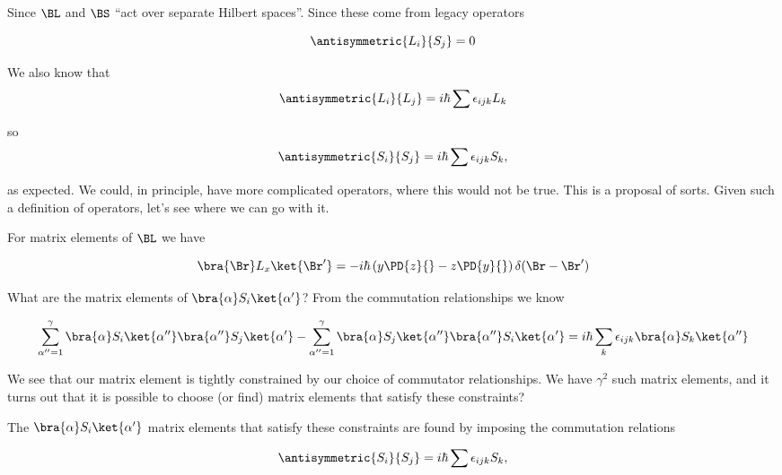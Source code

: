 Since $\BL$ and $\BS$ ``act over separate Hilbert spaces''.   Since these come from legacy operators

\begin{equation}\label{eqn:qmTwoL13:230}
\antisymmetric{L_i}{S_j} = 0
\end{equation}

We also know that
\begin{equation}\label{eqn:qmTwoL13:250}
\antisymmetric{L_i}{L_j} = i \hbar \sum \epsilon_{i j k} L_k
\end{equation}

so
\begin{equation}\label{eqn:qmTwoL13:270}
\antisymmetric{S_i}{S_j} = i \hbar \sum \epsilon_{i j k} S_k, 
\end{equation}

as expected.  We could, in principle, have more complicated operators, where this would not be true.  This is a proposal of sorts.  Given such a definition of operators, let's see where we can go with it.

For matrix elements of $\BL$ we have

\begin{equation}\label{eqn:qmTwoL13:290}
\bra{\Br} L_x \ket{\Br'} = -i \hbar \left( 
y \PD{z}{}
-z \PD{y}{} \right) \delta(\Br- \Br')
\end{equation}

What are the matrix elements of $\bra{\alpha} S_i \ket{\alpha'}$?  From the commutation relationships we know

\begin{equation}\label{eqn:qmTwoL13:310}
\sum_{\alpha'' = 1}^\gamma 
\bra{\alpha} S_i \ket{\alpha''}
\bra{\alpha''} S_j \ket{\alpha'}
-
\sum_{\alpha'' = 1}^\gamma 
\bra{\alpha} S_j \ket{\alpha''}
\bra{\alpha''} S_i \ket{\alpha'}
=
i \hbar \sum_k \epsilon_{ijk} 
\bra{\alpha} S_k \ket{\alpha''}
\end{equation}

We see that our matrix element is tightly constrained by our choice of commutator relationships.  We have $\gamma^2$ such matrix elements, and it turns out that it is possible to choose (or find) matrix elements that satisfy these constraints?

The $\bra{\alpha} S_i \ket{\alpha'}$ matrix elements that satisfy these constraints are found by imposing the commutation relations

\begin{equation}\label{eqn:qmTwoL13:330}
\antisymmetric{S_i}{S_j} = i \hbar \sum \epsilon_{i j k} S_k, 
\end{equation}

